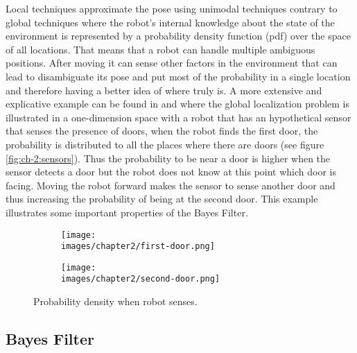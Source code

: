 Local techniques approximate the pose using unimodal techniques contrary to global techniques where the robot’s internal knowledge about the state of the environment is represented by a probability density function (pdf) over the space of all locations\cite{Thrun:robotic-statistics}. That means that a robot can handle multiple ambiguous positions. After moving it can sense other factors in the environment that can lead to disambiguate its pose and put most of the probability in a single location and therefore having a better idea of where truly is. A more extensive and explicative example can be found in \cite{Thrun:robotic-statistics} and \cite{Liao:bayesian-filters} where the global localization problem is illustrated in a one-dimension space with a robot that has an hypothetical sensor that senses the presence of doors, when the robot finds the first door, the probability is distributed to all the places where there are doors (see figure \ref{fig:ch-2:sensors}). Thus the probability to be near a door is higher when the sensor detects a door but the robot does not know at this point which door is facing. Moving the robot forward makes the sensor to sense another door and thus increasing the probability of being at the second door. This example illustrates some important properties of the Bayes Filter.

\begin{figure}[h!]
  \centering
  \begin{subfigure}[b]{\linewidth}
  	\texttt{[image: \\images/chapter2/first-door.png]}
  \end{subfigure}
  \vspace{1cm}
  \begin{subfigure}[b]{\linewidth}
  	\texttt{[image: \\images/chapter2/second-door.png]}
  \end{subfigure}
  \caption{Probability density when robot senses.}
  \label{fig:ch-2:bayes-filter-example}
\end{figure}


\subsection{Bayes Filter}


